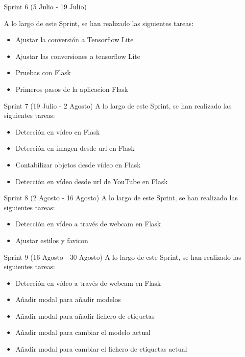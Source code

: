 Sprint 6 (5 Julio - 19 Julio)

A lo largo de este Sprint, se han realizado las siguientes tareas:

\begin{itemize}
    \item Ajustar la conversión a Tensorflow Lite
    \item Ajustar las conversiones a tensorflow Lite
    \item Pruebas con Flask
    \item Primeros pasos de la aplicacion Flask
\end{itemize}

\clearpage

Sprint 7 (19 Julio - 2 Agosto)
A lo largo de este Sprint, se han realizado las siguientes tareas:

\begin{itemize}
    \item Detección en vídeo en Flask
    \item Detección en imagen desde url en Flask
    \item Contabilizar objetos desde vídeo en Flask
    \item Detección en vídeo desde url de YouTube en Flask
\end{itemize}

Sprint 8 (2 Agosto - 16 Agosto)
A lo largo de este Sprint, se han realizado las siguientes tareas:

\begin{itemize}
    \item Detección en vídeo a través de webcam en Flask
    \item Ajustar estilos y favicon
\end{itemize}

Sprint 9 (16 Agosto - 30 Agosto)
A lo largo de este Sprint, se han realizado las siguientes tareas:

\begin{itemize}
    \item Detección en vídeo a través de webcam en Flask
    \item Añadir modal para añadir modelos
    \item Añadir modal para añadir fichero de etiquetas
    \item Añadir modal para cambiar el modelo actual
    \item Añadir modal para cambiar el fichero de etiquetas actual
\end{itemize}

